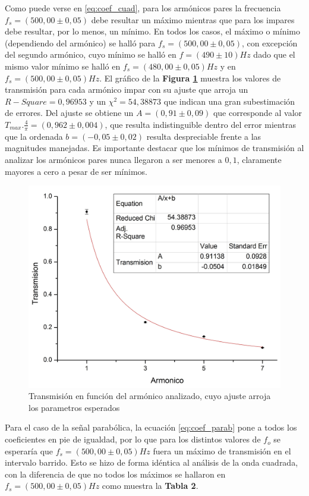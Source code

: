 \documentclass[11pt,a4paper]{article}
\begin{document}
Como puede verse en \eqref{eq:coef_cuad}, para los armónicos pares la frecuencia $f_s = (500,00 \pm 0,05)$ debe resultar un máximo mientras que para los impares debe resultar, por lo menos, un mínimo. En todos los casos, el máximo o mínimo (dependiendo del armónico) se halló para $f_s = (500,00 \pm 0,05)$, con excepción del segundo armónico, cuyo mínimo se halló en $f = (490 \pm 10)Hz$ dado que el mismo valor mínimo se halló en $f_s = (480,00 \pm 0,05)Hz$ y en $f_s = (500,00 \pm 0,05)Hz$. El gráfico de la \textbf{Figura \ref{fig:transcuad}} muestra los valores de transmisión para cada armónico impar con su ajuste que arroja un $R-Square = 0,96953$ y un $\chi^2 = 54,38873$ que indican una gran subestimación de errores. Del ajuste se obtiene un $A = (0,91 \pm 0,09)$ que corresponde al valor $T_{max}.\frac{4}{\pi} = (0,962 \pm 0,004)$, que resulta indistinguible dentro del error mientras que la ordenada $b =(-0,05 \pm 0,02)$ resulta despreciable frente a las magnitudes manejadas. Es importante destacar que los mínimos de transmisión al analizar los armónicos pares nunca llegaron a ser menores a $0,1$, claramente mayores a cero a pesar de ser mínimos. 
\begin{figure}[h]
\centering
\includegraphics[scale=0.4]{Trans_vs_Arm_Cuad}
\caption{Transmisión en función del armónico analizado, cuyo ajuste arroja los parametros esperados}
\label{fig:transcuad}
\end{figure}

Para el caso de la señal parabólica, la ecuación \eqref{eq:coef_parab} pone a todos los coeficientes en pie de igualdad, por lo que para los distintos valores de $f_o$ se esperaría que $f_s = (500,00 \pm 0,05)Hz$ fuera un máximo de transmisión en el intervalo barrido. Esto se hizo de forma idéntica al análisis de la onda cuadrada, con la diferencia de que no todos los máximos se hallaron en $f_s = (500,00 \pm 0,05)Hz$ como muestra la \textbf{Tabla 2}.
\end{document}
